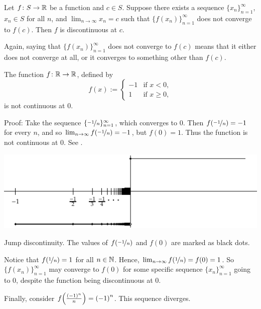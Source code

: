\begin{prop}
Let $f \colon S \to {\mathbb{R}}$ be a function and $c \in S$.  Suppose 
there exists a sequence $\{ x_n \}_{n=1}^\infty$, $x_n \in S$ for all $n$,
and $\lim_{n\to\infty} x_n = c$
such that $\bigl\{ f(x_n) \bigr\}_{n=1}^\infty$
does not converge to $f(c)$.
Then $f$ is discontinuous at $c$.
\end{prop}

Again, 
saying that 
$\bigl\{ f(x_n) \bigr\}_{n=1}^\infty$ does not converge to $f(c)$
means that it
either does not converge
at all, or it converges to something
other than $f(c)$.

\begin{example} \label{example:jumpdiscont}
The function $f \colon {\mathbb{R}} \to {\mathbb{R}}$, defined by
\begin{equation*}
f(x) := 
\begin{cases}
-1 & \text{if } x < 0, \\
1 & \text{if } x \geq 0,
\end{cases}
\end{equation*}
is not continuous at 0.

Proof: Take the sequence $\{ \nicefrac{-1}{n} \}_{n=1}^\infty$, which converges to 0.  Then
$f(\nicefrac{-1}{n}) = -1$ for every $n$,
and so
$\lim_{n\to\infty} f(\nicefrac{-1}{n}) = -1$, but $f(0) = 1$.  Thus the function is
not continuous at 0.  See
.

\begin{myfigureht}
\includegraphics{figures/jumpdiscont}
\caption{Jump discontinuity.  The values of
$f(\nicefrac{-1}{n})$ and $f(0)$ are marked as black dots.\label{fig:jumpdiscont}}
\end{myfigureht}

Notice that $f(\nicefrac{1}{n}) = 1$ for all $n \in {\mathbb{N}}$.
Hence, $\lim_{n\to\infty} f(\nicefrac{1}{n}) = f(0) = 1$.  So
$\bigl\{ f(x_n) \bigr\}_{n=1}^\infty$ may converge to $f(0)$
for some specific
sequence $\{ x_n \}_{n=1}^\infty$ going to 0,
despite the function being discontinuous at 0.

Finally, consider $f\Bigl(\frac{{(-1)}^n}{n}\Bigr) = {(-1)}^n$.
This sequence diverges.
\end{example}

